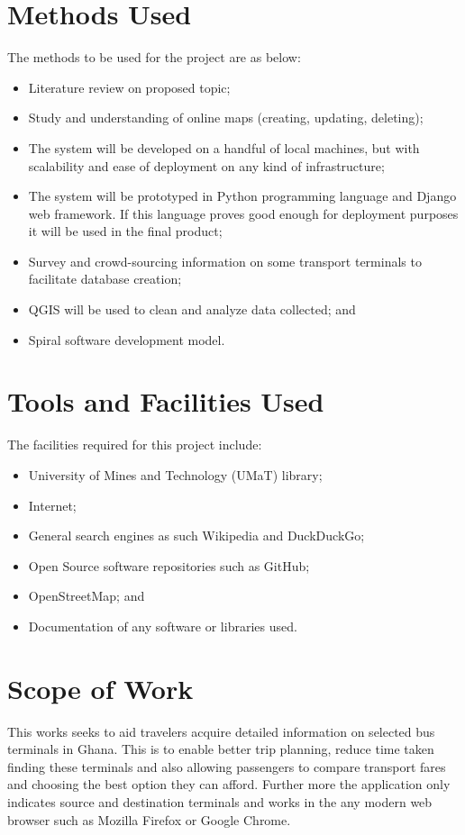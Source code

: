\section{Methods Used}
The methods to be used for the project are as below:
\begin{itemize}
	\item Literature review on proposed topic;
	\item Study and understanding of online maps (creating, updating, deleting);
	\item The system will be developed on a handful of local machines, but with scalability and ease of deployment on any kind of infrastructure;
	\item The system will be prototyped in Python programming language and Django web framework. If this language proves good enough for deployment purposes it will be used in the final product;
	\item Survey and crowd-sourcing information on some transport terminals to facilitate database creation;
	\item QGIS will be used to clean and analyze data collected; and
	\item Spiral software development model.
\end{itemize}

\section{Tools and Facilities Used}
The facilities required for this project include:
\begin{itemize}
	\item University of Mines and Technology (UMaT) library;
	\item Internet;
	\item General search engines as such Wikipedia and DuckDuckGo;
	\item Open Source software repositories such as GitHub;
	\item OpenStreetMap; and
	\item Documentation of any software or libraries used.
\end{itemize}

\section{Scope of Work}
This works seeks to aid travelers acquire detailed information on selected bus terminals in Ghana. This is to enable better trip planning, reduce time taken finding these terminals and also allowing passengers to compare transport fares and choosing the best option they can afford.
Further more the application only indicates source and destination terminals and works in the any modern web browser such as Mozilla Firefox or Google Chrome.

